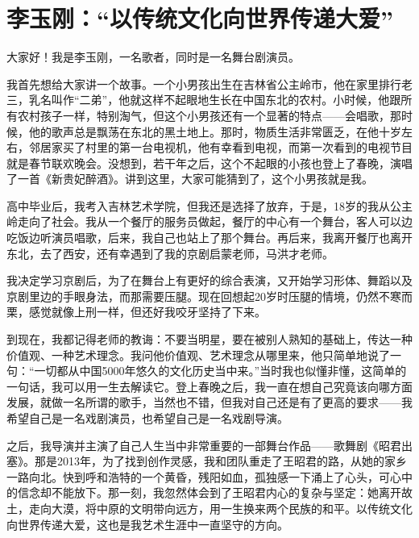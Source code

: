
\section*{李玉刚：“以传统文化向世界传递大爱”}


大家好！我是李玉刚，一名歌者，同时是一名舞台剧演员。

我首先想给大家讲一个故事。一个小男孩出生在吉林省公主岭市，他在家里排行老三，乳名叫作“二弟”，他就这样不起眼地生长在中国东北的农村。小时候，他跟所有农村孩子一样，特别淘气，但这个小男孩还有一个显著的特点——会唱歌，那时候，他的歌声总是飘荡在东北的黑土地上。那时，物质生活非常匮乏，在他十岁左右，邻居家买了村里的第一台电视机，他有幸看到电视，而第一次看到的电视节目就是春节联欢晚会。没想到，若干年之后，这个不起眼的小孩也登上了春晚，演唱了一首《新贵妃醉酒》。讲到这里，大家可能猜到了，这个小男孩就是我。

高中毕业后，我考入吉林艺术学院，但我还是选择了放弃，于是，18岁的我从公主岭走向了社会。我从一个餐厅的服务员做起，餐厅的中心有一个舞台，客人可以边吃饭边听演员唱歌，后来，我自己也站上了那个舞台。再后来，我离开餐厅也离开东北，去了西安，还有幸遇到了我的京剧启蒙老师，马洪才老师。

我决定学习京剧后，为了在舞台上有更好的综合表演，又开始学习形体、舞蹈以及京剧里边的手眼身法，而那需要压腿。现在回想起20岁时压腿的情境，仍然不寒而栗，感觉就像上刑一样，但还好我咬牙坚持了下来。

到现在，我都记得老师的教诲：不要当明星，要在被别人熟知的基础上，传达一种价值观、一种艺术理念。我问他价值观、艺术理念从哪里来，他只简单地说了一句：“一切都从中国5000年悠久的文化历史当中来。”当时我也似懂非懂，这简单的一句话，我可以用一生去解读它。登上春晚之后，我一直在想自己究竟该向哪方面发展，就做一名所谓的歌手，当然也不错，但我对自己还是有了更高的要求——我希望自己是一名戏剧演员，也希望自己是一名戏剧导演。

之后，我导演并主演了自己人生当中非常重要的一部舞台作品——歌舞剧《昭君出塞》。那是2013年，为了找到创作灵感，我和团队重走了王昭君的路，从她的家乡一路向北。快到呼和浩特的一个黄昏，残阳如血，孤独感一下涌上了心头，可心中的信念却不能放下。那一刻，我忽然体会到了王昭君内心的复杂与坚定：她离开故土，走向大漠，将中原的文明带向远方，用一生换来两个民族的和平。以传统文化向世界传递大爱，这也是我艺术生涯中一直坚守的方向。

